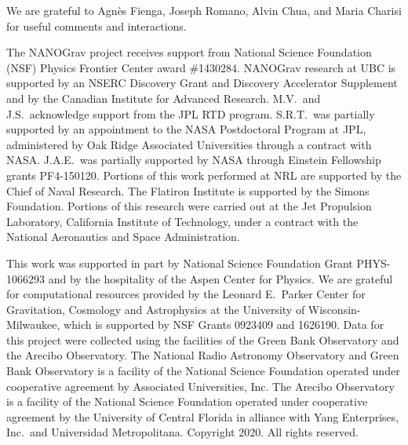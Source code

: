 \acknowledgments We are grateful to Agn\`es Fienga, Joseph Romano, Alvin Chua, and Maria Charisi for useful comments and interactions.

The NANOGrav project receives support from National Science Foundation (NSF) Physics Frontier Center award \#1430284.
NANOGrav research at UBC is supported by an NSERC Discovery Grant and Discovery Accelerator Supplement and by the Canadian Institute for Advanced Research.
M.V.\ and J.S.\ acknowledge support from the JPL RTD program.
S.R.T.\ was partially supported by an appointment to the NASA Postdoctoral Program at JPL, administered by Oak Ridge Associated Universities through a contract with NASA.
J.A.E.\ was partially supported by NASA through Einstein Fellowship grants PF4-150120.
Portions of this work performed at NRL are supported by the Chief of Naval Research.
The Flatiron Institute is supported by the Simons Foundation.
Portions of this research were carried out at the Jet Propulsion Laboratory, California Institute of Technology, under a contract with the National Aeronautics and Space Administration.

This work was supported in part by National Science Foundation Grant PHYS-1066293 and by the hospitality of the Aspen Center for Physics.
We are grateful for computational resources provided by the Leonard E.\ Parker Center for Gravitation, Cosmology and Astrophysics at the University of Wisconsin-Milwaukee, which is supported by NSF Grants 0923409 and 1626190.
Data for this project were collected using the facilities of the Green Bank Observatory and the Arecibo Observatory.
The National Radio Astronomy Observatory and Green Bank Observatory is a facility of the National Science Foundation operated under cooperative agreement by Associated Universities, Inc.
The Arecibo Observatory is a facility of the National Science Foundation operated under cooperative agreement by the University of Central Florida in alliance with Yang Enterprises, Inc.\ and Universidad Metropolitana.
Copyright 2020. All rights reserved.
